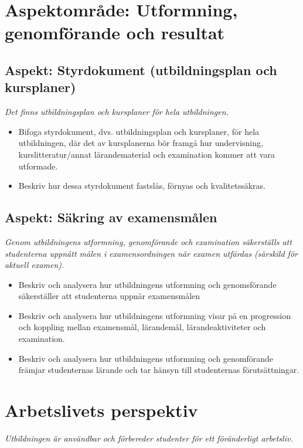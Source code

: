 \documentclass[10pt,article,oneside]{memoir}
\begin{document}
\section{Aspektområde: Utformning, genomförande och resultat}

\subsection{Aspekt: Styrdokument (utbildningsplan och kursplaner)}

\emph{Det finns utbildningsplan och kursplaner för hela utbildningen.}
    
\begin{itemize}
\item Bifoga styrdokument, dvs. utbildningsplan och kursplaner, för hela utbildningen, där det av kursplanerna bör framgå hur undervisning, kurslitteratur/annat lärandematerial och examination kommer att vara utformade.
\item Beskriv hur dessa styrdokument fastslås, förnyas och kvalitetssäkras.
\end{itemize}  

\subsection{Aspekt: Säkring av examensmålen}

\emph{Genom utbildningens utformning, genomförande och examination säkerställs att studenterna uppnått målen i examensordningen när examen utfärdas (särskild för aktuell examen).}

\begin{itemize}    
\item Beskriv och analysera hur utbildningens utformning och genomsförande säkerställer att studenterna uppnår examensmålen
\item Beskriv och analysera hur utbildningens utformning visar på en progression och koppling mellan examensmål, lärandemål, lärandeaktiviteter och examination.
\item Beskriv och analysera hur utbildningens utformning och genomförande främjar studenternas lärande och tar hänsyn till studenternas förutsättningar.
\end{itemize}

\section{Arbetslivets perspektiv}

\emph{Utbildningen är användbar och förbereder studenter för ett föränderligt arbetsliv.}
  
\end{document}

